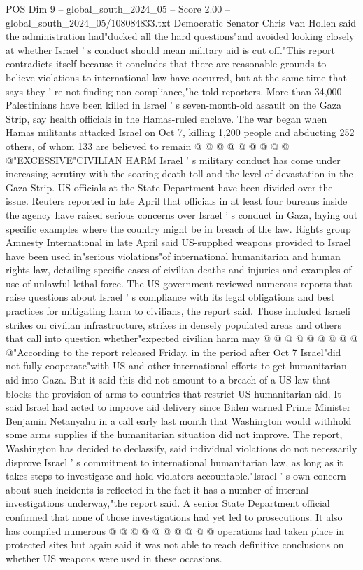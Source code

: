 \begin{textsample}{POS Dim 9 – global\_south\_2024\_05 – Score 2.00 – global\_south\_2024\_05/108084833.txt}
Democratic Senator Chris Van Hollen said the administration had"ducked all the hard questions"and avoided looking closely at whether Israel ' s conduct should mean military aid is cut off."This report contradicts itself because it concludes that there are reasonable grounds to believe violations to international law have occurred, but at the same time that says they ' re not finding non compliance,"he told reporters.
More than 34,000 Palestinians have been killed in Israel ' s seven-month-old assault on the Gaza Strip, say health officials in the Hamas-ruled enclave.
The war began when Hamas militants attacked Israel on Oct 7, killing 1,200 people and abducting 252 others, of whom 133 are believed to remain @ @ @ @ @ @ @ @ @ @"EXCESSIVE"CIVILIAN HARM Israel ' s military conduct has come under increasing scrutiny with the soaring death toll and the level of devastation in the Gaza Strip.
US officials at the State Department have been divided over the issue.
Reuters reported in late April that officials in at least four bureaus inside the agency have raised serious concerns over Israel ' s conduct in Gaza, laying out specific examples where the country might be in breach of the law.
Rights group Amnesty International in late April said US-supplied weapons provided to Israel have been used in"serious violations"of international humanitarian and human rights law, detailing specific cases of civilian deaths and injuries and examples of use of unlawful lethal force.
The US government reviewed numerous reports that raise questions about Israel ' s compliance with its legal obligations and best practices for mitigating harm to civilians, the report said.
Those included Israeli strikes on civilian infrastructure, strikes in densely populated areas and others that call into question whether"expected civilian harm may @ @ @ @ @ @ @ @ @ @"According to the report released Friday, in the period after Oct 7 Israel"did not fully cooperate"with US and other international efforts to get humanitarian aid into Gaza.
But it said this did not amount to a breach of a US law that blocks the provision of arms to countries that restrict US humanitarian aid.
It said Israel had acted to improve aid delivery since Biden warned Prime Minister Benjamin Netanyahu in a call early last month that Washington would withhold some arms supplies if the humanitarian situation did not improve.
The report, Washington has decided to declassify, said individual violations do not necessarily disprove Israel ' s commitment to international humanitarian law, as long as it takes steps to investigate and hold violators accountable."Israel ' s own concern about such incidents is reflected in the fact it has a number of internal investigations underway,"the report said.
A senior State Department official confirmed that none of those investigations had yet led to prosecutions.
It also has compiled numerous @ @ @ @ @ @ @ @ @ @ operations had taken place in protected sites but again said it was not able to reach definitive conclusions on whether US weapons were used in these occasions.

\end{textsample}
